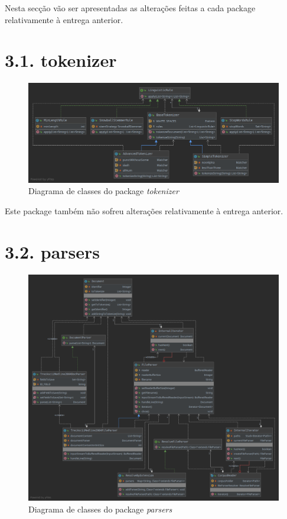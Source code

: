 \documentclass[12pt]{article}
\begin{document}
Nesta secção vão ser apresentadas as alterações feitas a cada package
relativamente à entrega anterior.

\section*{3.1. tokenizer}
\begin{figure}[H]
  \center
  \includegraphics[width=\linewidth]{packages_tokenizer.png}
  \caption{Diagrama de classes do package \it tokenizer}
\end{figure}

Este package também não sofreu alterações relativamente à
entrega anterior.

\section*{3.2. parsers}
\begin{figure}[H]
  \center
  \includegraphics[width=\linewidth]{packages_parsers}
  \caption{Diagrama de classes do package \it parsers}
\end{figure}
\end{document}

